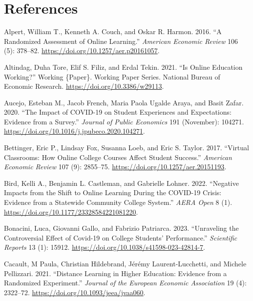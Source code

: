 \documentclass[
  12pt,
  letterpaper,
  DIV=11,
  numbers=noendperiod]{scrartcl}
\newlength{\cslhangindent}
\newenvironment{CSLReferences}[2] %
 {\begin{list}{}{%
  \setlength{\itemindent}{0pt}
  \setlength{\leftmargin}{0pt}
  \setlength{\parsep}{0pt}
  \ifodd #1
   \setlength{\leftmargin}{\cslhangindent}
   \setlength{\itemindent}{-1\cslhangindent}
  \fi
  \setlength{\itemsep}{#2\baselineskip}}}
 {\end{list}}
\begin{document}
\pagebreak

\section{References}\label{references}

\label{refs}
\begin{CSLReferences}{1}{0}
Alpert, William T., Kenneth A. Couch, and Oskar R. Harmon. 2016. {``A
{Randomized} {Assessment} of {Online} {Learning}.''} \emph{American
Economic Review} 106 (5): 378--82.
\url{https://doi.org/10.1257/aer.p20161057}.

Altindag, Duha Tore, Elif S. Filiz, and Erdal Tekin. 2021. {``Is
{Online} {Education} {Working}?''} Working \{Paper\}. Working {Paper}
{Series}. National Bureau of Economic Research.
\url{https://doi.org/10.3386/w29113}.

Aucejo, Esteban M., Jacob French, Maria Paola Ugalde Araya, and Basit
Zafar. 2020. {``The Impact of {COVID}-19 on Student Experiences and
Expectations: {Evidence} from a Survey.''} \emph{Journal of Public
Economics} 191 (November): 104271.
\url{https://doi.org/10.1016/j.jpubeco.2020.104271}.

Bettinger, Eric P., Lindsay Fox, Susanna Loeb, and Eric S. Taylor. 2017.
{``Virtual {Classrooms}: {How} {Online} {College} {Courses} {Affect}
{Student} {Success}.''} \emph{American Economic Review} 107 (9):
2855--75. \url{https://doi.org/10.1257/aer.20151193}.

Bird, Kelli A., Benjamin L. Castleman, and Gabrielle Lohner. 2022.
{``Negative {Impacts} from the {Shift} to {Online} {Learning} During the
{COVID}-19 {Crisis}: {Evidence} from a {Statewide} {Community} {College}
{System}.''} \emph{AERA Open} 8 (1).
\url{https://doi.org/10.1177/23328584221081220}.

Bonacini, Luca, Giovanni Gallo, and Fabrizio Patriarca. 2023.
{``Unraveling the Controversial Effect of {Covid}-19 on College
Students' Performance.''} \emph{Scientific Reports} 13 (1): 15912.
\url{https://doi.org/10.1038/s41598-023-42814-7}.

Cacault, M Paula, Christian Hildebrand, Jérémy Laurent-Lucchetti, and
Michele Pellizzari. 2021. {``Distance {Learning} in {Higher}
{Education}: {Evidence} from a {Randomized} {Experiment}.''}
\emph{Journal of the European Economic Association} 19 (4): 2322--72.
\url{https://doi.org/10.1093/jeea/jvaa060}.


\end{CSLReferences}
\end{document}
